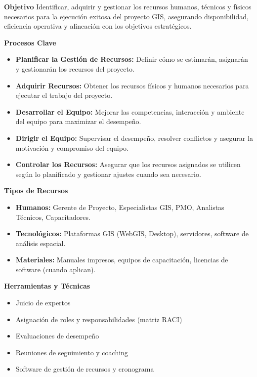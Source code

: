       \begin{multicols}{2}

\textbf{Objetivo}
Identificar, adquirir y gestionar los recursos humanos, técnicos y físicos necesarios para la ejecución exitosa del proyecto GIS, asegurando disponibilidad, eficiencia operativa y alineación con los objetivos estratégicos.

\textbf{Procesos Clave}
\begin{itemize}
    \item \textbf{Planificar la Gestión de Recursos:} Definir cómo se estimarán, asignarán y gestionarán los recursos del proyecto.
    \item \textbf{Adquirir Recursos:} Obtener los recursos físicos y humanos necesarios para ejecutar el trabajo del proyecto.
    \item \textbf{Desarrollar el Equipo:} Mejorar las competencias, interacción y ambiente del equipo para maximizar el desempeño.
    \item \textbf{Dirigir el Equipo:} Supervisar el desempeño, resolver conflictos y asegurar la motivación y compromiso del equipo.
    \item \textbf{Controlar los Recursos:} Asegurar que los recursos asignados se utilicen según lo planificado y gestionar ajustes cuando sea necesario.
\end{itemize}

\textbf{Tipos de Recursos}
\begin{itemize}
    \item \textbf{Humanos:} Gerente de Proyecto, Especialistas GIS, PMO, Analistas Técnicos, Capacitadores.
    \item \textbf{Tecnológicos:} Plataformas GIS (WebGIS, Desktop), servidores, software de análisis espacial.
    \item \textbf{Materiales:} Manuales impresos, equipos de capacitación, licencias de software (cuando aplican).
\end{itemize}

\textbf{Herramientas y Técnicas}
\begin{itemize}
    \item Juicio de expertos
    \item Asignación de roles y responsabilidades (matriz RACI)
    \item Evaluaciones de desempeño
    \item Reuniones de seguimiento y coaching
    \item Software de gestión de recursos y cronograma
\end{itemize}


\end{multicols}
